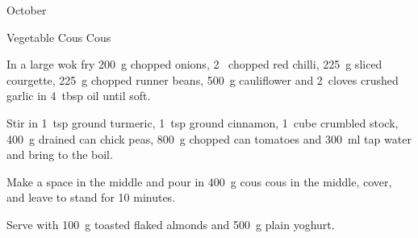 \begin{menu}{October}
\begin{recipe}{2}{Vegetable Cous Cous}
    \begin{instructions}
    \item 
        In a large wok fry
        200~g chopped onions,
        2~ chopped red chilli,
        225~g sliced courgette,
        225~g chopped runner beans,
        500~g  cauliflower
        and
        2~cloves crushed garlic
        in
        4~tbsp  oil
        until soft.
      \item 
        Stir in
        1~tsp  ground turmeric,
        1~tsp  ground cinnamon,
        1~cube crumbled stock,
        400~g drained can chick peas,
        800~g chopped can tomatoes
        and
        300~ml  tap water
        and bring to the boil.
      \item 
        Make a space in the middle and pour in
        400~g  cous cous
        in the middle, cover,
        and leave to stand for 10 minutes.
      \item 
        Serve with
        100~g toasted flaked almonds
        and
        500~g  plain yoghurt.
      
    \end{instructions}
    \end{recipe}%
  
    \clearpage
    \end{menu}
	
